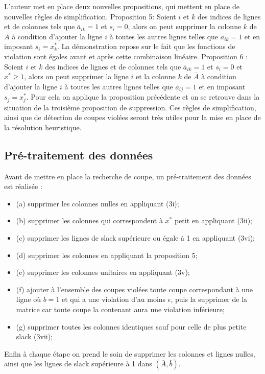 \documentclass[12pt]{report}
\begin{document}
\newline
\newline
L'auteur met en place deux nouvelles propositions, qui mettent en place de nouvelles règles de simplification.
\newline
\large{Proposition 5:}
\newline
Soient $i$ et $k$ des indices de lignes et de colonnes tels que $\overset{\_}{a}_{ik}=1$ et $s_i=0$, alors on peut supprimer la colonne $k$ de $\overset{\_}{A}$ à condition d'ajouter la ligne $i$ à toutes les autres lignes telles que $\overset{\_}{a}_{ik}=1$ et en imposant $s_i=x^\ast_k$.
La démonstration repose sur le fait que les fonctions de violation sont égales avant et après cette combinaison linéaire.
\newline
\large{Proposition 6 :}
\newline
Soient $i$ et $k$ des indices de lignes et de colonnes tels que $\overset{\_}{a}_{ik}=1$ et $s_i=0$ et $x^\ast \ge 1$, alors on peut supprimer la ligne $i$ et la colonne $k$ de $\overset{\_}{A}$ à condition d'ajouter la ligne $i$ à toutes les autres lignes telles que $\overset{\_}{a}_{ij}=1$ et en imposant $s_j=x^\ast_j$. Pour cela on applique la proposition précédente et on se retrouve dans la situation de la troisième proposition de suppression.
\newline
\newline
Ces règles de simplification, ainsi que de détection de coupes violées seront très utiles pour la mise en place de la résolution heuristique. 

\subsection{Pré-traitement des données}
Avant de mettre en place la recherche de coupe, un pré-traitement des données est réalisée : 
\begin{itemize}
    \item (a) supprimer les colonnes nulles en appliquant (3i);
    \item (b) supprimer les colonnes qui correspondent à $x^\ast$ petit en appliquant (3ii);
    \item (c) supprimer les lignes de slack supérieure ou égale à 1 en appliquant (3vi);
    \item (d) supprimer les colonnes en appliquant la proposition 5;
    \item (e) supprimer les colonnes unitaires en appliquant (3v);
    \item (f) ajouter à l'ensemble des coupes violées toute coupe correspondant à une ligne où $\overset{\_}{b}=1$ et qui a une violation d'au moins $\epsilon$, puis la supprimer de la matrice car toute coupe la contenant aura une violation inférieure;
    \item (g) supprimer toutes les colonnes identiques sauf pour celle de plus petite slack (3vii);
\end{itemize}
Enfin à chaque étape on prend le soin de supprimer les colonnes et lignes nulles, ainsi que les lignes de slack supérieure à 1 dans $(\overset{\_}{A},\overset{\_}{b})$.
\end{document}
